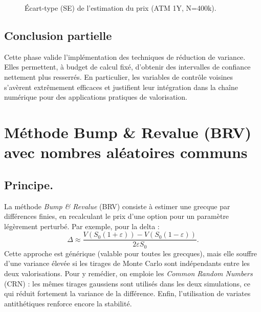 \documentclass[a4paper,11pt]{article}
\begin{document}
\begin{figure}[H]
\centering
{}
\caption{Écart-type (SE) de l’estimation du prix (ATM 1Y, N=400k).}
\end{figure}


\subsection{Conclusion partielle}
Cette phase valide l’implémentation des techniques de réduction de variance.
Elles permettent, à budget de calcul fixé, d’obtenir des intervalles de confiance
nettement plus resserrés. En particulier, les variables de contrôle voisines
s’avèrent extrêmement efficaces et justifient leur intégration dans la chaîne
numérique pour des applications pratiques de valorisation.

\section{Méthode Bump \& Revalue (BRV) avec nombres aléatoires communs}

\subsection*{Principe.}
La méthode \emph{Bump \& Revalue} (BRV) consiste à estimer une grecque par 
différences finies, en recalculant le prix d’une option pour un paramètre légèrement perturbé.
Par exemple, pour la delta :
\[
\Delta \approx \frac{V(S_0(1+\varepsilon)) - V(S_0(1-\varepsilon))}{2\varepsilon S_0}.
\]
Cette approche est générique (valable pour toutes les grecques), mais elle souffre d’une variance élevée si les tirages de Monte Carlo sont indépendants entre les deux valorisations.  
Pour y remédier, on emploie les \emph{Common Random Numbers} (CRN) : les mêmes tirages gaussiens sont utilisés dans les deux simulations, ce qui réduit fortement la variance de la différence.  
Enfin, l’utilisation de variates antithétiques renforce encore la stabilité.
\end{document}

